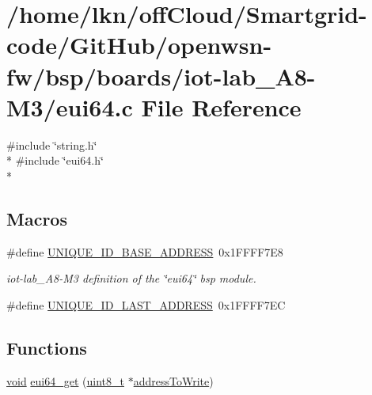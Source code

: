 \hypertarget{iot-lab___a8-_m3_2eui64_8c}{}\section{/home/lkn/off\+Cloud/\+Smartgrid-\/code/\+Git\+Hub/openwsn-\/fw/bsp/boards/iot-\/lab\+\_\+\+A8-\/\+M3/eui64.c File Reference}
\label{iot-lab___a8-_m3_2eui64_8c}
{\ttfamily \#include \char`\"{}string.\+h\char`\"{}}\\*
{\ttfamily \#include \char`\"{}eui64.\+h\char`\"{}}\\*
\subsection*{Macros}
\begin{DoxyCompactItemize}
\item 
\#define \hyperlink{iot-lab___a8-_m3_2eui64_8c_a13ace2b7d86e7d30c89c7b1fa720859a}{U\+N\+I\+Q\+U\+E\+\_\+\+I\+D\+\_\+\+B\+A\+S\+E\+\_\+\+A\+D\+D\+R\+E\+SS}~0x1\+F\+F\+F\+F7\+E8
\begin{DoxyCompactList}\small\item\em iot-\/lab\+\_\+\+A8-\/\+M3 definition of the \char`\"{}eui64\char`\"{} bsp module. \end{DoxyCompactList}\item 
\#define \hyperlink{iot-lab___a8-_m3_2eui64_8c_ab59ec9c178356b200db5d5f90253b1b9}{U\+N\+I\+Q\+U\+E\+\_\+\+I\+D\+\_\+\+L\+A\+S\+T\+\_\+\+A\+D\+D\+R\+E\+SS}~0x1\+F\+F\+F\+F7\+EC
\end{DoxyCompactItemize}
\subsection*{Functions}
\begin{DoxyCompactItemize}
\item 
\hyperlink{usb__devapi_8h_afabf60e7f57651d6d595a02c75f07cd0}{void} \hyperlink{group__eui64_gae49dc9068e3f46bfd188579192fc036b}{eui64\+\_\+get} (\hyperlink{_p_e___types_8h_aba7bc1797add20fe3efdf37ced1182c5}{uint8\+\_\+t} $\ast$\hyperlink{samr21__xpro_201bsp__flash_201bsp__flash_8c_a1f7d4f7dc49d64e8ffe1ff2e385657e5}{address\+To\+Write})
\end{DoxyCompactItemize}
